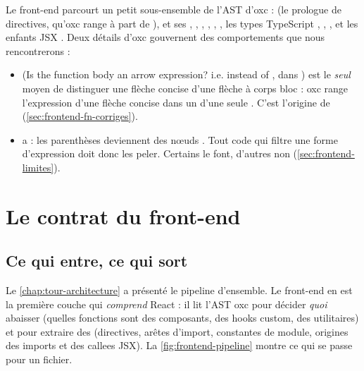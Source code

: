 Le front-end parcourt un petit sous-ensemble de l'AST d'oxc :  (le prologue de directives, qu'oxc range à part de ),  et ses , , , , , , les types TypeScript , , , et les enfants JSX . Deux détails d'oxc gouvernent des comportements que nous rencontrerons :
\begin{itemize}
  \item {} (\og Is the function body an arrow expression? i.e.  instead of \code{() => {}}\fg{}, dans ) est le \emph{seul} moyen de distinguer une flèche concise d'une flèche à corps bloc : oxc range l'expression d'une flèche concise dans un  d'une seule . C'est l'origine de  (\cref{sec:frontend-fn-corriges}).
  \item {} a  : les parenthèses deviennent des nœuds . Tout code qui filtre une forme d'expression doit donc les \og peler\fg{}. Certains le font, d'autres non (\cref{sec:frontend-limites}).
\end{itemize}

\section{Le contrat du front-end}
\label{sec:frontend-contrat}

\subsection{Ce qui entre, ce qui sort}

Le \cref{chap:tour-architecture} a présenté le pipeline d'ensemble. Le front-end en est la première couche qui \emph{comprend} React : il lit l'AST oxc pour décider \emph{quoi} abaisser (quelles fonctions sont des composants, des hooks custom, des utilitaires) et pour extraire des  (directives, arêtes d'import, constantes de module, origines des imports et des callees JSX). La \cref{fig:frontend-pipeline} montre ce qui se passe pour un fichier.

